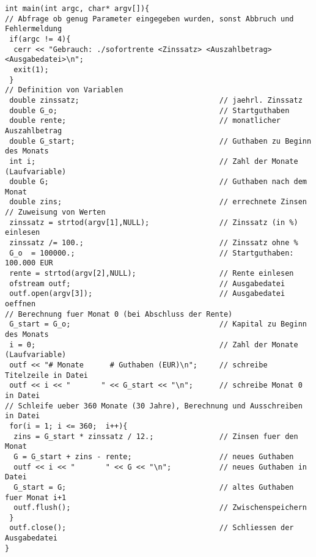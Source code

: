 \documentclass[10pt, a4paper]{article}
\begin{document}
\begin{lstlisting}
int main(int argc, char* argv[]){
// Abfrage ob genug Parameter eingegeben wurden, sonst Abbruch und Fehlermeldung
 if(argc != 4){
  cerr << "Gebrauch: ./sofortrente <Zinssatz> <Auszahlbetrag> <Ausgabedatei>\n";
  exit(1);
 }
// Definition von Variablen
 double zinssatz;                                // jaehrl. Zinssatz
 double G_o;                                     // Startguthaben
 double rente;                                   // monatlicher Auszahlbetrag
 double G_start;                                 // Guthaben zu Beginn des Monats
 int i;                                          // Zahl der Monate (Laufvariable)
 double G;                                       // Guthaben nach dem Monat
 double zins;                                    // errechnete Zinsen
// Zuweisung von Werten
 zinssatz = strtod(argv[1],NULL);                // Zinssatz (in %) einlesen
 zinssatz /= 100.;                               // Zinssatz ohne %
 G_o  = 100000.;                                 // Startguthaben: 100.000 EUR
 rente = strtod(argv[2],NULL);                   // Rente einlesen
 ofstream outf;                                  // Ausgabedatei
 outf.open(argv[3]);                             // Ausgabedatei oeffnen
// Berechnung fuer Monat 0 (bei Abschluss der Rente)
 G_start = G_o;                                  // Kapital zu Beginn des Monats
 i = 0;                                          // Zahl der Monate (Laufvariable)
 outf << "# Monate      # Guthaben (EUR)\n";     // schreibe Titelzeile in Datei
 outf << i << "       " << G_start << "\n";      // schreibe Monat 0 in Datei
// Schleife ueber 360 Monate (30 Jahre), Berechnung und Ausschreiben in Datei
 for(i = 1; i <= 360;  i++){                    
  zins = G_start * zinssatz / 12.;               // Zinsen fuer den Monat
  G = G_start + zins - rente;                    // neues Guthaben
  outf << i << "       " << G << "\n";           // neues Guthaben in Datei
  G_start = G;                                   // altes Guthaben fuer Monat i+1
  outf.flush();                                  // Zwischenspeichern
 }
 outf.close();                                   // Schliessen der Ausgabedatei
}
\end{lstlisting}
\end{document}

